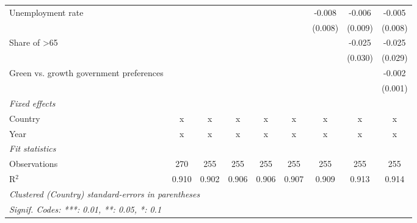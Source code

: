 \begin{table}[htbp]
\begin{tabular}{lcccccccc}
      Unemployment rate                       &         &         &              &              &              & -0.008       & -0.006      & -0.005\\   
                                              &         &         &              &              &              & (0.008)      & (0.009)     & (0.008)\\   
      Share of >65                            &         &         &              &              &              &              & -0.025      & -0.025\\   
                                              &         &         &              &              &              &              & (0.030)     & (0.029)\\   
      Green vs. growth government preferences &         &         &              &              &              &              &             & -0.002\\   
                                              &         &         &              &              &              &              &             & (0.001)\\   
      \emph{Fixed effects}\\
      Country                                 & x       & x       & x            & x            & x            & x            & x           & x\\  
      Year                                    & x       & x       & x            & x            & x            & x            & x           & x\\  
      \midrule \emph{Fit statistics}\\
      Observations                            & 270     & 255     & 255          & 255          & 255          & 255          & 255         & 255\\  
      R$^2$                                   & 0.910   & 0.902   & 0.906        & 0.906        & 0.907        & 0.909        & 0.913       & 0.914\\  
      \midrule
      \multicolumn{9}{l}{\emph{Clustered (Country) standard-errors in parentheses}}\\
      \multicolumn{9}{l}{\emph{Signif. Codes: ***: 0.01, **: 0.05, *: 0.1}}\\
   \end{tabular}
\end{table}


